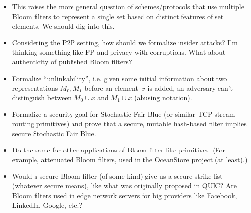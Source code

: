 \begin{itemize}
\item This raises the more general question of schemes/protocols that use multiple Bloom filters to represent a single set based on distinct features of set elements.  We should dig into this. 

\item Considering the P2P setting, how should we formalize insider attacks?  I'm thinking something like FP and privacy with corruptions.  What about authenticity of published Bloom filters?

\item Formalize ``unlinkability'', i.e. given some initial information about two representations $M_0,M_1$ before an element~$x$ is added, an adversary can't distinguish between $M_0 \cup x$ and $M_1 \cup x$ (abusing notation).  

\item Formalize a security goal for Stochastic Fair Blue (or similar TCP stream routing primitives) and prove that a secure, mutable hash-based filter implies secure Stochastic Fair Blue.

\item Do the same for other applications of Bloom-filter-like primitives.  (For example, attenuated Bloom filters, used in the OceanStore project (at least).)

\item Would a secure Bloom filter (of some kind) give us a secure strike list (whatever secure means), like what was originally proposed in QUIC?  Are Bloom filters used in edge network servers for big providers like Facebook, LinkedIn, Google, etc.?
\end{itemize}


